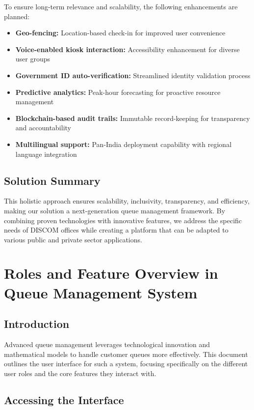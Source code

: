 \documentclass[12pt,a4paper]{report}
\begin{document}
To ensure long-term relevance and scalability, the following enhancements are planned:

\begin{itemize}
    \item \textbf{Geo-fencing:} Location-based check-in for improved user convenience
    \item \textbf{Voice-enabled kiosk interaction:} Accessibility enhancement for diverse user groups
    \item \textbf{Government ID auto-verification:} Streamlined identity validation process
    \item \textbf{Predictive analytics:} Peak-hour forecasting for proactive resource management
    \item \textbf{Blockchain-based audit trails:} Immutable record-keeping for transparency and accountability
    \item \textbf{Multilingual support:} Pan-India deployment capability with regional language integration
\end{itemize}

\section{Solution Summary}

This holistic approach ensures scalability, inclusivity, transparency, and efficiency, making our solution a next-generation queue management framework. By combining proven technologies with innovative features, we address the specific needs of DISCOM offices while creating a platform that can be adapted to various public and private sector applications.

\newpage
\chapter{Roles and Feature Overview in Queue Management System}

\section{Introduction}

Advanced queue management leverages technological innovation and mathematical models to handle customer queues more effectively. This document outlines the user interface for such a system, focusing specifically on the different user roles and the core features they interact with.

\section{Accessing the Interface}
\end{document}
